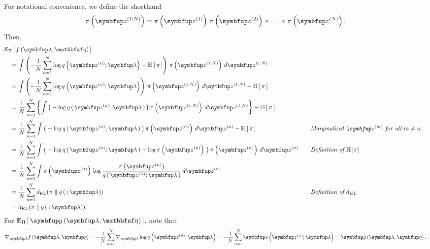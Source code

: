 \begin{proofEnd}
  For notational convenience, we define the shorthand
  \begin{align*}
    \pi\left(\vz^{(1:N)}\right) = \pi\left(\vz^{(1)}\right) \, \pi\left(\vz^{(2)}\right) \times \ldots \times \pi\left(\vz^{(N)}\right).
  \end{align*}
  Then,
  \begin{alignat}{2}
    &\Esub{\Pi}{ f\left(\vlambda, \rvveta\right) }
    \nonumber
    \\
    &\quad=
    \int \left(- \frac{1}{N} \sum^{N}_{n=1} \log q\left(\vz^{(n)}; \vlambda\right) - \mathbb{H}\left[\,\pi\,\right]\right) \, \pi\left(\vz^{(1:N)}\right) \, d\vz^{(1:N)}
    \nonumber
    \\
    &\quad=
    \int \left(- \frac{1}{N} \sum^{N}_{n=1} \log q\left(\vz^{(n)}; \vlambda\right)\right) \, \pi\left(\vz^{(1:N)}\right) \, d\vz^{(1:N)} - \mathbb{H}\left[\,\pi\,\right]
    \nonumber
    \\
    &\quad=
     \frac{1}{N} \sum^{N}_{n=1} \left\{ \int \big(-\log q\,(\,\vz^{(n)}; \vlambda\,)\,\big) \, \pi\left(\vz^{(1:N)}\right) \, d\vz^{(1:N)} \right\} - \mathbb{H}\,[\,\pi\,] 
    \nonumber
    \\
    &\quad=
    \frac{1}{N} \sum^{N}_{n=1} \int \big( -\log q\,(\,\vz^{(n)}; \vlambda\,) \,\big) \, \pi\left(\vz^{(n)}\right) \, d\vz^{(n)} - \mathbb{H}\,[\,\pi\,]
    &&\quad{\text{\textit{Marginalized \(\vz^{(m)}\) for all \(m \neq n\)}}}
    \nonumber
    \\
    &\quad=
    \frac{1}{N} \sum^{N}_{n=1} \int \big( -\log q\,(\,\vz^{(n)}; \vlambda\,) + \log\pi\left(\vz^{(n)}\right) \,\big) \, \pi\left(\vz^{(n)}\right) \, d\vz^{(n)}
    &&\quad{\text{\textit{Definition of \(\mathbb{H}\left[\pi\right]\)}}}
    \nonumber
    \\
    &\quad=
    \frac{1}{N} \sum^{N}_{n=1} \int \pi\left(\vz^{(n)}\right) \, \log \frac{\pi\left(\vz^{(n)}\right)}{q\,(\,\vz^{(n)}; \vlambda\,)}  \, d\vz^{(n)}
    \nonumber
    \\
    &\quad=
    \frac{1}{N} \sum^{N}_{n=1} \DKL{\pi}{q\left(\cdot; \vlambda\right)}
    \nonumber
    &&\quad{\text{\textit{Definition of \(d_{\text{KL}}\)}}}
    \\
    &\quad=
    \DKL{\pi}{q\left(\cdot; \vlambda\right)}.\label{eq:F_KL}
  \end{alignat}
  For \(\Esub{\Pi}{ \vg\left(\vlambda, \rvveta\right) }\), note that 
  \begin{align}
    \nabla_{\vlambda} f\left(\vlambda, \veta\right) = -\frac{1}{N} \sum^{N}_{n=1} \nabla_{\vlambda} \log q\left(\vz^{(n)}; \vlambda\right) = -\frac{1}{N} \sum^{N}_{n=1} \vs\left(\vz^{(n)}; \vlambda\right) = \vg\left(\vlambda, \veta\right).\label{eq:F_grad_G}

\end{align}
\end{proofEnd}
